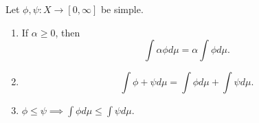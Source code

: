 \documentclass[pmath451]{subfiles}
\begin{document}
    \begin{prop}{}
        Let $\phi,\psi:X\to\left[ 0,\infty \right]$ be simple.
        \begin{enumerate}
            \item If $\alpha\geq 0$, then
                \begin{equation*}
                    \int\alpha\phi d\mu = \alpha\int\phi d\mu.
                \end{equation*}
            \item 
                \begin{equation*}
                    \int\phi+\psi d\mu = \int\phi d\mu + \int\psi d\mu.
                \end{equation*}
            \item $\phi\leq\psi\implies\int\phi d\mu\leq\int\psi d\mu$.
        \end{enumerate}
    \end{prop}
    
\end{document}
